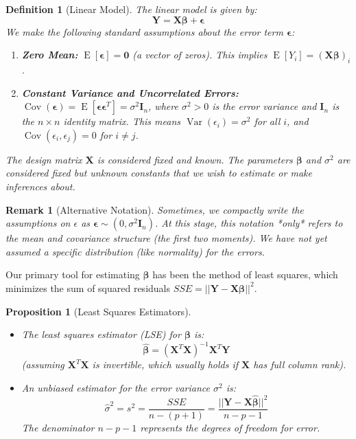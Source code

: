 \documentclass[11pt]{article}
\theoremstyle{mytheoremstyle}
\newtheorem{proposition}[theorem]{Proposition}
\theoremstyle{mydefinitionstyle}
\newtheorem{definition}[theorem]{Definition}
\newtheorem{remark}[theorem]{Remark}
\newcommand{\vect}[1]{\mathbf{#1}}
\DeclareMathOperator{\E}{E}
\DeclareMathOperator{\Var}{Var}
\DeclareMathOperator{\Cov}{Cov}
\begin{document}
\begin{definition}[Linear Model]
The linear model is given by:
\begin{equation*}
\vect{Y} = \vect{X}\vect{\beta} + \vect{\epsilon}
\end{equation*}
We make the following standard assumptions about the error term $\vect{\epsilon}$:
\begin{enumerate}
    \item \textbf{Zero Mean:} $\E[\vect{\epsilon}] = \vect{0}$ (a vector of zeros). This implies $\E[Y_i] = (\vect{X}\vect{\beta})_i$.
    \item \textbf{Constant Variance and Uncorrelated Errors:} $\Cov(\vect{\epsilon}) = \E[\vect{\epsilon}\vect{\epsilon}^T] = \sigma^2 \vect{I}_n$, where $\sigma^2 > 0$ is the error variance and $\vect{I}_n$ is the $n \times n$ identity matrix. This means $\Var(\epsilon_i) = \sigma^2$ for all $i$, and $\Cov(\epsilon_i, \epsilon_j) = 0$ for $i \neq j$.
\end{enumerate}
The design matrix $\vect{X}$ is considered fixed and known. The parameters $\vect{\beta}$ and $\sigma^2$ are considered fixed but unknown constants that we wish to estimate or make inferences about.
\end{definition}

\begin{remark}[Alternative Notation]
Sometimes, we compactly write the assumptions on $\epsilon$ as $\vect{\epsilon} \sim (0, \sigma^2 \vect{I}_n)$. At this stage, this notation *only* refers to the mean and covariance structure (the first two moments). We have not yet assumed a specific distribution (like normality) for the errors.
\end{remark}

Our primary tool for estimating $\vect{\beta}$ has been the method of least squares, which minimizes the sum of squared residuals $SSE = ||\vect{Y} - \vect{X}\vect{\beta}||^2$.

\begin{proposition}[Least Squares Estimators]
\hfill
\begin{itemize}
    \item The least squares estimator (LSE) for $\vect{\beta}$ is:
        \begin{equation*}
        \hat{\vect{\beta}} = (\vect{X}^T \vect{X})^{-1} \vect{X}^T \vect{Y}
        \end{equation*}
        (assuming $\vect{X}^T \vect{X}$ is invertible, which usually holds if $\vect{X}$ has full column rank).
    \item An unbiased estimator for the error variance $\sigma^2$ is:
        \begin{equation*}
        \hat{\sigma}^2 = s^2 = \frac{SSE}{n-(p+1)} = \frac{||\vect{Y} - \vect{X}\hat{\vect{\beta}}||^2}{n-p-1}
        \end{equation*}
        The denominator $n-p-1$ represents the degrees of freedom for error.
\end{itemize}
\end{proposition}
\end{document}
